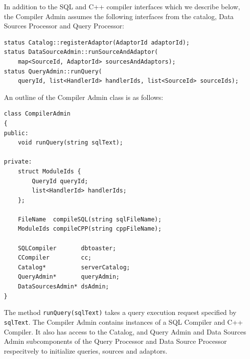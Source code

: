 \documentclass[14pt]{article}
\newcommand{\comment}[1]{}
\begin{document}
In addition to the SQL and C++ compiler interfaces which we describe below, the
Compiler Admin assumes the following interfaces from the catalog, Data Sources
Processor and Query Processor:

\begin{Verbatim}
status Catalog::registerAdaptor(AdaptorId adaptorId);
status DataSourceAdmin::runSourceAndAdaptor(
    map<SourceId, AdaptorId> sourcesAndAdaptors);
status QueryAdmin::runQuery(
    queryId, list<HandlerId> handlerIds, list<SourceId> sourceIds);
\end{Verbatim}


\comment{
Compiler Admin takes source code from User Input Hander, compiles it to
executable code and dispatches it to either Data Sources or Query Processor.
\comment{
Once user request is received, Compiler Admin takes over. Depending on the type
of the request Admin takes different actions.
}

On SQL query request Admin passes SQL query source file to SQL Compiler. SQL
compiler returns a file containing C++ implementation of it. This file is passed
to C++ compiler. C++ compiler returns a function handle to compiled binary of
this query. Finally query handle is passed to Query Admin to be added to a list
of executable queries.

On Reader request Admin passes Data Adaptor file to C++ compiler, which returns
a function handle to Data Adaptor. Admin creates a Data Source Reader and opens
a connection (either a socket or a file). Handle to Data Source together with
handle to Data Adaptor is passed to Data Sources Admin.
}

\noindent An outline of the Compiler Admin class is as follows:
\begin{Verbatim}
class CompilerAdmin
{
public:
    void runQuery(string sqlText);

private:
    struct ModuleIds {
        QueryId queryId;
        list<HandlerId> handlerIds;
    };

    FileName  compileSQL(string sqlFileName);
    ModuleIds compileCPP(string cppFileName);
	
    SQLCompiler       dbtoaster;
    CCompiler         cc;
    Catalog*          serverCatalog;
    QueryAdmin*       queryAdmin;
    DataSourcesAdmin* dsAdmin;
}
\end{Verbatim}

The method \texttt{runQuery(sqlText)} takes a query execution request specified by
\texttt{sqlText}. The Compiler Admin contains instances of a SQL Compiler and C++
Compiler. It also has access to the Catalog, and Query Admin and Data Sources
Admin subcomponents of the Query Processor and Data Source Processor
respecitvely to initialize queries, sources and adaptors.
\end{document}
